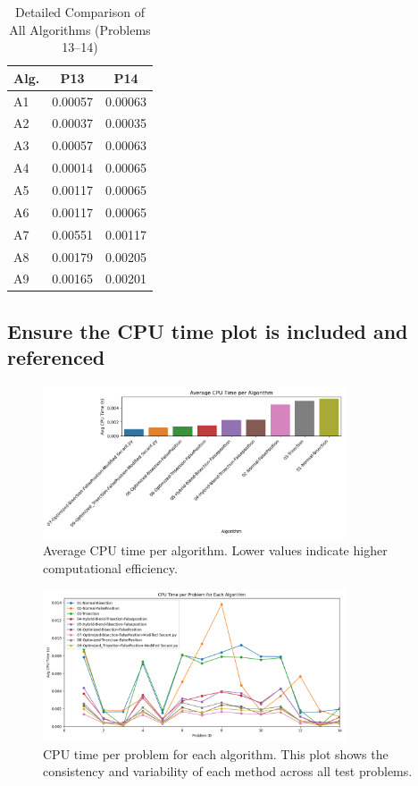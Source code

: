 \documentclass[11pt,a4paper]{article}
\begin{document}
\begin{table}[H]
\centering
\caption{Detailed Comparison of All Algorithms (Problems 13--14)}
\label{tab:detailed_comparison_4}
\begin{tabular}{lcc}
\toprule
Alg. & P13 & P14 \\
\midrule
A1 & 0.00057 & 0.00063 \\
A2 & 0.00037 & 0.00035 \\
A3 & 0.00057 & 0.00063 \\
A4 & 0.00014 & 0.00065 \\
A5 & 0.00117 & 0.00065 \\
A6 & 0.00117 & 0.00065 \\
A7 & 0.00551 & 0.00117 \\
A8 & 0.00179 & 0.00205 \\
A9 & 0.00165 & 0.00201 \\
\bottomrule
\end{tabular}
\end{table}

\subsection{Ensure the CPU time plot is included and referenced}

\begin{figure}[H]
    \centering
    \includegraphics[width=0.8\textwidth]{avg_cpu_time_per_algorithm.png}
    \caption{Average CPU time per algorithm. Lower values indicate higher computational efficiency.}
    \label{fig:avg_cpu_time_per_algorithm}
\end{figure}

\begin{figure}[H]
    \centering
    \includegraphics[width=0.8\textwidth]{cpu_time_lineplot_per_problem.png}
    \caption{CPU time per problem for each algorithm. This plot shows the consistency and variability of each method across all test problems.}
    \label{fig:cpu_time_lineplot_per_problem}
\end{figure}
\end{document}
